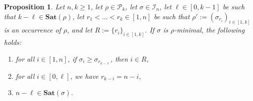 \documentclass[a4paper,11pt]{article}
\newtheorem{prop}[thm]{Proposition}
\theoremstyle{definition}
\theoremstyle{remark}
\newcommand{\I}{\mathcal{I}}
\renewcommand{\P}{\mathcal{P}}
\newcommand{\Sat}{\mathbf{Sat}}
\begin{document}
\begin{prop} \label{prop_sat_pattern}
    Let $n,k \geq 1$, let $\rho \in \P_k$, let $\sigma \in \I_n$, let ${\ell \in [0,k-1]}$ be such that $k-\ell \in \Sat(\rho)$, let ${r_1 < \dots < r_k \in [1,n]}$ be such that $\rho' := (\sigma_{r_i})_{i \in [1,k]}$ is an occurrence of $\rho$, and let $R := \{r_i\}_{i \in [1,k]}$. If $\sigma$ is $\rho$-minimal, the following holds:
    \begin{enumerate}
        \item for all $i \in [1,n]$, if $\sigma_i \geq \sigma_{r_{k-\ell}}$, then $i \in R$,
        \item for all $i \in [0,\ell]$, we have $r_{k-i} = n-i$,
        \item $n - \ell \in \Sat(\sigma)$.
    \end{enumerate}
\end{prop}
\end{document}
